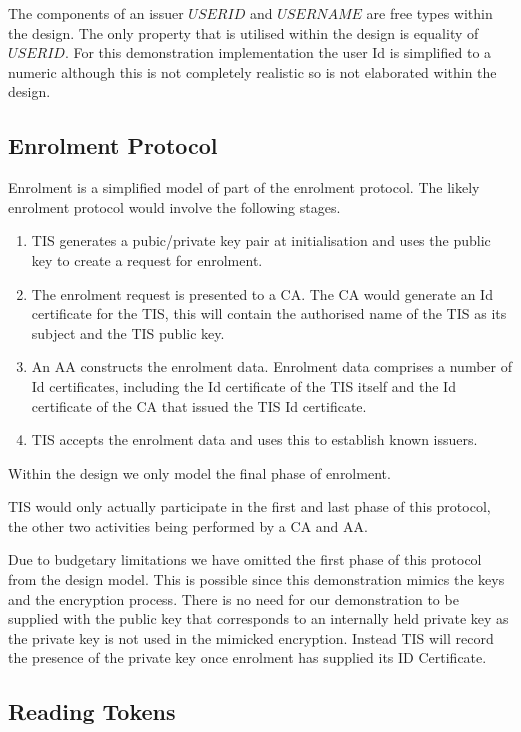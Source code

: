 The components of an issuer $USERID$ and $USERNAME$ are free types 
within the design. The only property that is utilised within the
design is equality of  
$USERID$. For this demonstration implementation the user Id is simplified to a 
numeric although this is not completely realistic so is not elaborated
within the  
design.

\subsection{Enrolment Protocol}
Enrolment is a simplified model of part of the enrolment protocol. The likely 
enrolment protocol would involve the following stages.
\begin{enumerate}
\item
 TIS generates a pubic/private key pair at 
initialisation and uses the public key to create a request for enrolment. 
\item
The enrolment request is presented to a CA. The CA would generate an Id certificate 
for the TIS, this will contain the authorised name of the TIS as its subject and the TIS 
public key. 
\item
An AA constructs the enrolment data. 
Enrolment data comprises a number of Id certificates, including the Id 
certificate of the TIS itself and the Id certificate of the CA that issued the TIS Id 
certificate. 
\item
TIS accepts the enrolment data and uses this to establish known issuers.
\end{enumerate}
Within the design we only model the final phase of enrolment. 

TIS would only actually participate in the first and last phase of
this protocol, the other two activities being performed by a CA and
AA.  

Due to budgetary limitations we have omitted the first phase of this
protocol from the design model. This is possible since this
demonstration mimics the keys and the encryption process. There is no
need for our demonstration to be supplied with the  
public key that corresponds to an internally held private key as the
private key is not used in the mimicked encryption. Instead TIS will
record the presence of the private  
key once enrolment has supplied its ID Certificate. 

\subsection{Reading Tokens}


